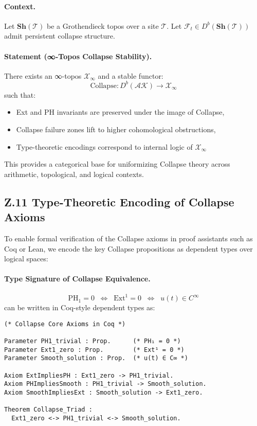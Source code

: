 \documentclass[11pt]{article}
\begin{document}
\paragraph{Context.}
Let \( \mathbf{Sh}(\mathcal{T}) \) be a Grothendieck topos over a site \( \mathcal{T} \).  
Let \( \mathcal{F}_t \in D^b(\mathbf{Sh}(\mathcal{T})) \) admit persistent collapse structure.

\paragraph{Statement (∞-Topos Collapse Stability).}
There exists an ∞-topos \( \mathcal{X}_\infty \) and a stable functor:
\[
\text{Collapse} : D^b(\mathcal{AK}) \longrightarrow \mathcal{X}_\infty
\]
such that:
\begin{itemize}
  \item Ext and PH invariants are preserved under the image of Collapse,
  \item Collapse failure zones lift to higher cohomological obstructions,
  \item Type-theoretic encodings correspond to internal logic of \( \mathcal{X}_\infty \)
\end{itemize}

This provides a categorical base for uniformizing Collapse theory across arithmetic, topological, and logical contexts.

\subsection*{Z.11 Type-Theoretic Encoding of Collapse Axioms}

To enable formal verification of the Collapse axioms in proof assistants such as Coq or Lean,  
we encode the key Collapse propositions as dependent types over logical spaces:

\paragraph{Type Signature of Collapse Equivalence.}
\[
\mathrm{PH}_1 = 0 \;\; \Leftrightarrow \;\; \mathrm{Ext}^1 = 0 \;\; \Leftrightarrow \;\; u(t) \in C^\infty
\]
can be written in Coq-style dependent types as:

\begin{lstlisting}[language=Coq, caption=Collapse Structure Encoding in Coq]
(* Collapse Core Axioms in Coq *)

Parameter PH1_trivial : Prop.      (* PH₁ = 0 *)
Parameter Ext1_zero : Prop.        (* Ext¹ = 0 *)
Parameter Smooth_solution : Prop.  (* u(t) ∈ C∞ *)

Axiom ExtImpliesPH : Ext1_zero -> PH1_trivial.
Axiom PHImpliesSmooth : PH1_trivial -> Smooth_solution.
Axiom SmoothImpliesExt : Smooth_solution -> Ext1_zero.

Theorem Collapse_Triad :
  Ext1_zero <-> PH1_trivial <-> Smooth_solution.
\end{lstlisting}
\end{document}
